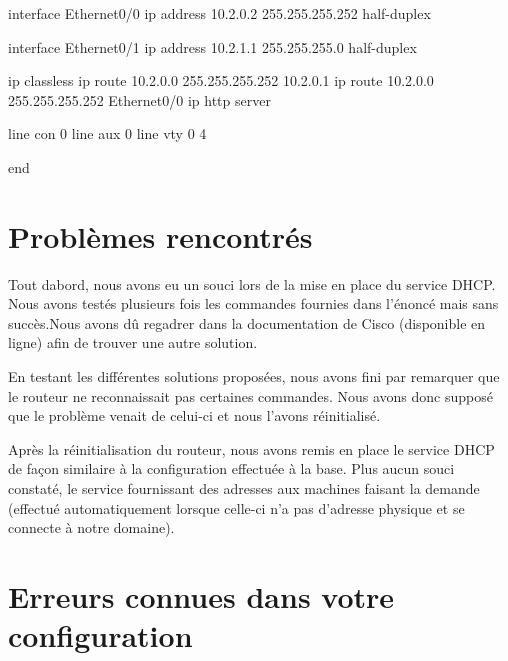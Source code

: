 \documentclass{article}
\begin{document}
interface Ethernet0/0
 ip address 10.2.0.2 255.255.255.252
 half-duplex

interface Ethernet0/1
 ip address 10.2.1.1 255.255.255.0
 half-duplex

ip classless
ip route 10.2.0.0 255.255.255.252 10.2.0.1
ip route 10.2.0.0 255.255.255.252 Ethernet0/0
ip http server

line con 0
line aux 0
line vty 0 4

end

\section{Problèmes rencontrés}

Tout dabord, nous avons eu un souci lors de la mise en place du service DHCP. Nous avons testés
plusieurs fois les commandes fournies dans l'énoncé mais sans succès.Nous avons dû regadrer dans
la documentation de Cisco (disponible en ligne) afin de trouver une autre solution.

En testant les différentes solutions proposées, nous avons fini par remarquer que le routeur
ne reconnaissait pas certaines commandes. Nous avons donc supposé que le problème venait de celui-ci
et nous l'avons réinitialisé.

Après la réinitialisation du routeur, nous avons remis en place le service DHCP de façon similaire
à la configuration effectuée à la base. Plus aucun souci constaté, le service fournissant des adresses
aux machines faisant la demande (effectué automatiquement lorsque celle-ci n'a pas d'adresse physique et se connecte à notre domaine).
\section{Erreurs connues dans votre configuration}
\end{document}
